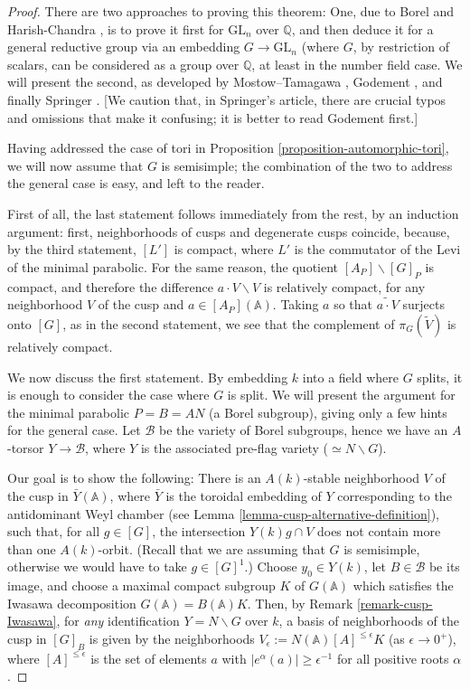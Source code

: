 \begin{proof}
There are two approaches to proving this theorem: One, due to Borel and Harish-Chandra \cite{Borel-HC}, is to prove it first for $\text{GL}_n$ over $\mathbb Q$, and then deduce it for a general reductive group via an embedding $G\to \text{GL}_n$ (where $G$, by restriction of scalars, can be considered as a group over $\mathbb Q$, at least in the number field case. We will present the second, as developed by Mostow--Tamagawa \cite{Mostow-Tamagawa}, Godement \cite{Godement-domaines-fondamentaux}, and finally Springer \cite{Springer-reduction-theory}. [We caution that, in Springer's article, there are crucial typos and omissions that make it confusing; it is better to read Godement first.]

Having addressed the case of tori in Proposition \ref{proposition-automorphic-tori}, we will now assume that $G$ is semisimple; the combination of the two to address the general case is easy, and left to the reader. 

First of all, the last statement follows immediately from the rest, by an induction argument: first, neighborhoods of cusps and degenerate cusps coincide, because, by the third statement, $[L']$ is compact, where $L'$ is the commutator of the Levi of the minimal parabolic. For the same reason, the quotient $[A_P]\backslash [G]_P$ is compact, and therefore the difference $a\cdot V \smallsetminus V$ is relatively compact, for any neighborhood $V$ of the cusp and $a\in [A_P](\mathbb A)$. Taking $a$ so that $\widetilde{a\cdot V}$ surjects onto $[G]$, as in the second statement, we see that the complement of $\pi_G(\tilde V)$ is relatively compact. 
 
 We now discuss the first statement. By embedding $k$ into a field where $G$ splits, it is enough to consider the case where $G$ is split. We will present the argument for the minimal parabolic $P=B = AN$ (a Borel subgroup), giving only a few hints for the general case. Let $\mathcal B$ be the variety of Borel subgroups, hence we have an $A$-torsor $Y\to \mathcal B$, where $Y$ is the associated pre-flag variety ($\simeq N\backslash G$). 
 
 Our goal is to show the following: There is an $A(k)$-stable neighborhood $V$ of the cusp in $\bar Y(\mathbb A)$, where $\bar Y$ is the toroidal embedding of $Y$ corresponding to the antidominant Weyl chamber (see Lemma \ref{lemma-cusp-alternative-definition}), such that, for all $g\in [G]$, the intersection $Y(k) g \cap V$ does not contain more than one $A(k)$-orbit. (Recall that we are assuming that $G$ is semisimple, otherwise we would have to take $g\in [G]^1$.) Choose $y_0\in Y(k)$, let $B\in \mathcal B$ be its image, and choose a maximal compact subgroup $K$ of $G(\mathbb A)$ which satisfies the Iwasawa decomposition $G(\mathbb A) = B(\mathbb A)K$. 
 Then, by Remark \ref{remark-cusp-Iwasawa}, for \emph{any} identification $Y = N\backslash G$ over $k$, a basis of neighborhoods of the cusp in $[G]_B$ is given by the neighborhoods $V_\epsilon := N(\mathbb A)[A]^{\le \epsilon} K$ (as $\epsilon\to 0^+$), where $[A]^{\le \epsilon}$ is the set of elements $a$ with $|e^\alpha(a)|\ge \epsilon^{-1}$ for all positive roots $\alpha$. 
 

\end{proof}
